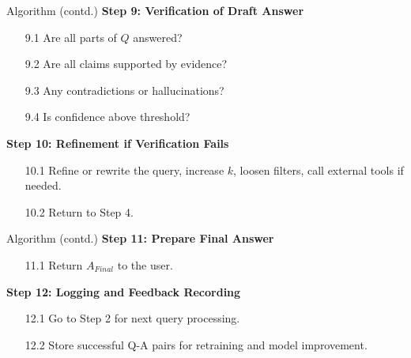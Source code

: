 \begin{frame}{Algorithm (contd.)}
\textbf{Step 9: Verification of Draft Answer}
\begin{itemize}
  \item[9.1] Are all parts of $Q$ answered?
  \item[9.2] Are all claims supported by evidence?
  \item[9.3] Any contradictions or hallucinations?
  \item[9.4] Is confidence above threshold?
\end{itemize}

\textbf{Step 10: Refinement if Verification Fails}
\begin{itemize}
  \item[10.1] Refine or rewrite the query, increase $k$, loosen filters, call external tools if needed.
  \item[10.2] Return to Step 4.
\end{itemize}
\end{frame}

\begin{frame}{Algorithm (contd.)}
\textbf{Step 11: Prepare Final Answer}
\begin{itemize}
  \item[11.1] Return $A_{Final}$ to the user.
\end{itemize}

\textbf{Step 12: Logging and Feedback Recording}
\begin{itemize}
  \item[12.1] Go to Step 2 for next query processing.
  \item[12.2] Store successful Q-A pairs for retraining and model improvement.
\end{itemize}
\end{frame}
